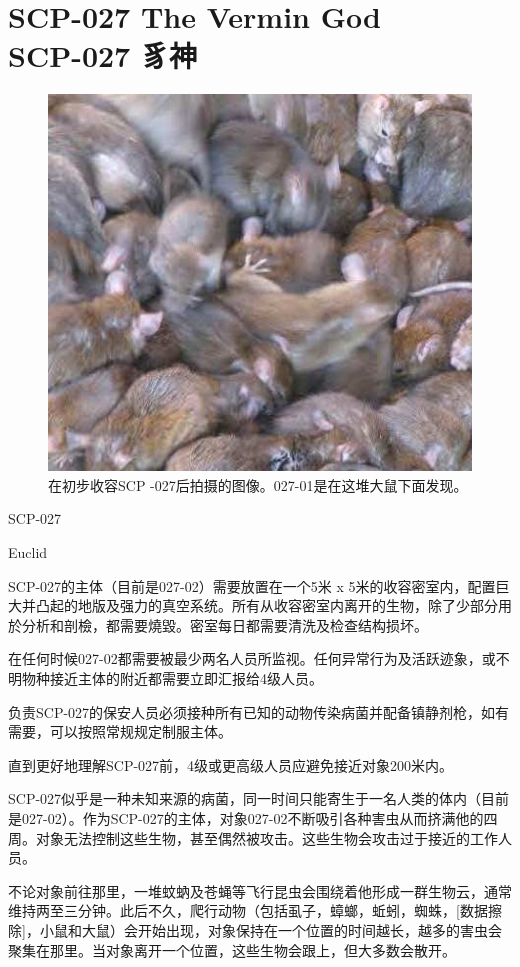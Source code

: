 \chapter[SCP-027 豸神]{
    SCP-027 The Vermin God\\
    SCP-027 豸神
}

\label{chap:SCP-027}

\begin{figure}[H]
    \centering
    \includegraphics[width=0.5\linewidth]{images/SCP.027.jpg}
    \caption*{在初步收容SCP -027后拍摄的图像。027-01是在这堆大鼠下面发现。}
\end{figure}

SCP-027

Euclid

SCP-027的主体（目前是027-02）需要放置在一个5米 x 5米的收容密室内，配置巨大并凸起的地版及强力的真空系统。所有从收容密室内离开的生物，除了少部分用於分析和剖檢，都需要燒毀。密室每日都需要清洗及检查结构损坏。

在任何时候027-02都需要被最少两名人员所监视。任何异常行为及活跃迹象，或不明物种接近主体的附近都需要立即汇报给4级人员。

负责SCP-027的保安人员必须接种所有已知的动物传染病菌并配备镇静剂枪，如有需要，可以按照常规规定制服主体。

直到更好地理解SCP-027前，4级或更高级人员应避免接近对象200米内。

SCP-027似乎是一种未知来源的病菌，同一时间只能寄生于一名人类的体内（目前是027-02）。作为SCP-027的主体，对象027-02不断吸引各种害虫从而挤满他的四周。对象无法控制这些生物，甚至偶然被攻击。这些生物会攻击过于接近的工作人员。

不论对象前往那里，一堆蚊蚋及苍蝇等飞行昆虫会围绕着他形成一群生物云，通常维持两至三分钟。此后不久，爬行动物（包括虱子，蟑螂，蚯蚓，蜘蛛，[数据擦除]，小鼠和大鼠）会开始出现，对象保持在一个位置的时间越长，越多的害虫会聚集在那里。当对象离开一个位置，这些生物会跟上，但大多数会散开。

